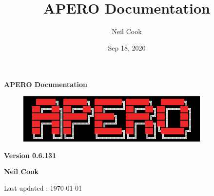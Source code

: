 \documentclass[a4paper,10pt,english]{report}
\title{APERO Documentation}
\date{Sep 18, 2020}
\author{Neil Cook}
\begin{document}
\pagestyle{empty}


        \begin{titlepage}
            \centering

            \vspace*{40mm} %
            \textbf{\Huge {APERO Documentation}}

            \vspace{5mm}
            \begin{figure}[!h]
                \centering
                \includegraphics[scale=1]{apero_logo.png}
            \end{figure}
            
            \vspace{5mm}
            \Large \textbf{Version 0.6.131}
            
            \vspace{5mm}
            \Large \textbf{{Neil Cook}}

            \vspace*{0mm}
            \small  Last updated : \MonthYearFormat\today


        \end{titlepage}

        \clearpage
        \tableofcontents

        
\pagestyle{plain}
 
\pagestyle{normal}
\label{\detokenize{index::doc}}
\end{document}
